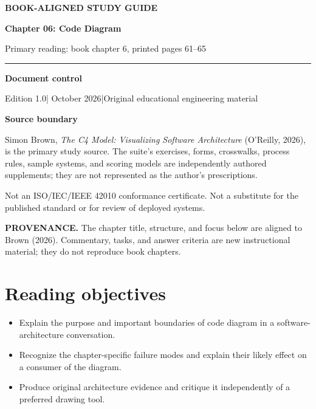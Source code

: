 \documentclass[10pt,letterpaper]{article}
\newcommand{\SourceNote}[1]{\par\smallskip\noindent\colorbox{C4Light}{\parbox{0.94\linewidth}{\footnotesize\textbf{PROVENANCE.} #1}}\par\medskip}
\newcommand{\DocStart}[3]{%
\begin{document}
\begin{titlepage}
\renewcommand{\thepage}{title-\arabic{page}}
\vspace*{0.55in}
{\sffamily\bfseries\small\color{C4Teal}#1}\par\vspace{0.24in}
{\sffamily\bfseries\fontsize{26}{31}\selectfont\color{C4Navy}#2}\par\vspace{0.18in}
{\large\color{C4Gray}#3}\par\vspace{0.4in}
\textcolor{C4Teal}{\rule{\linewidth}{1.15pt}}\par\vspace{0.24in}
\textbf{Document control}\par
Edition 1.0\quad|\quad 30 October 2026\quad|\quad Original educational engineering material\par
\vspace{0.17in}
\textbf{Source boundary}\par
Simon Brown, \emph{The C4 Model: Visualizing Software Architecture} (O'Reilly, 2026), is the primary study source. The suite's exercises, forms, crosswalks, process rules, sample systems, and scoring models are independently authored supplements; they are not represented as the author's prescriptions.\par
\vfill
{\small\color{C4Gray}Not an ISO/IEC/IEEE 42010 conformance certificate. Not a substitute for the published standard or for review of deployed systems.}\par
\end{titlepage}
}
\DocStart{BOOK-ALIGNED STUDY GUIDE}{Chapter 06: Code Diagram}{Primary reading: book chapter 6, printed pages 61–65}
\SourceNote{The chapter title, structure, and focus below are aligned to Brown (2026). Commentary, tasks, and answer criteria are new instructional material; they do not reproduce book chapters.}
\section{Reading objectives}
\begin{itemize}
\item Explain the purpose and important boundaries of code diagram in a software-architecture conversation.
\item Recognize the chapter-specific failure modes and explain their likely effect on a consumer of the diagram.
\item Produce original architecture evidence and critique it independently of a preferred drawing tool.
\end{itemize}
\end{document}
